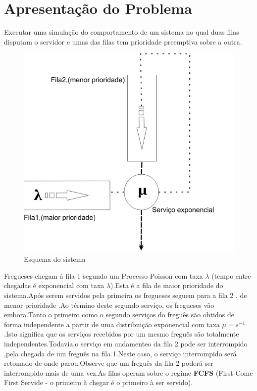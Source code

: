 \documentclass[a4paper,10pt]{article}
\begin{document}
\section{Apresentação do Problema}
   Executar uma simulação do comportamento de um sistema no qual duas filas disputam o servidor e umas das filas tem prioridade preemptiva sobre a outra.
   \begin{figure}[H]
      \center
      \includegraphics[scale=3]{AD-Relatorio.jpg}
      \caption{Esquema do sistema}
  \end{figure}
  Fregueses chegam à fila 1 segundo um Processo Poisson com taxa $\lambda$ (tempo entre chegadas é exponencial com taxa $\lambda$).Esta é a fila de maior prioridade do sistema.Após
  serem servidos pela primeira os fregueses seguem para a fila 2 , de menor prioridade .Ao término deste segundo serviço, os fregueses vão embora.Tanto o primeiro como o segundo 
  serviços do freguês são obtidos de forma independente a partir de uma distribuição exponencial com taxa $\mu=s^{-1}$.Isto significa que os serviços
  recebidos por um mesmo freguês são totalmente independentes.Todavia,o serviço em andamenteo da fila 2 pode ser interrompido ,pela chegada de um freguês na fila 1.Neste caso, o serviço
  interrompido será retomado de onde parou.Observe que um freguês da fila 2 poderá ser interrompido mais de uma vez.As filas operam sobre o regime \textbf{FCFS} (First Come First Servide -
  o primeiro à chegar é o primeiro à ser servido).
\end{document}
